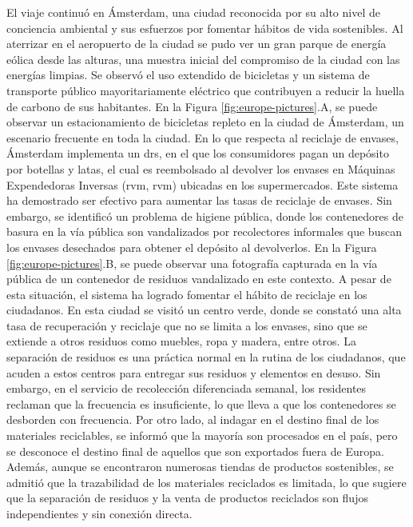 El viaje continuó en Ámsterdam, una ciudad reconocida por su alto nivel de conciencia ambiental y sus esfuerzos por fomentar hábitos de vida sostenibles. Al aterrizar en el aeropuerto de la ciudad se pudo ver un gran parque de energía eólica desde las alturas, una muestra inicial del compromiso de la ciudad con las energías limpias. Se observó el uso extendido de bicicletas y un sistema de transporte público mayoritariamente eléctrico que contribuyen a reducir la huella de carbono de sus habitantes. En la Figura \ref{fig:europe-pictures}.A, se puede observar un estacionamiento de bicicletas repleto en la ciudad de Ámsterdam, un escenario frecuente en toda la ciudad. En lo que respecta al reciclaje de envases, Ámsterdam implementa un \acrshort{drs}, en el que los consumidores pagan un depósito por botellas y latas, el cual es reembolsado al devolver los envases en Máquinas Expendedoras Inversas (\acrshort{rvm}, \acrlong{rvm}) ubicadas en los supermercados. Este sistema ha demostrado ser efectivo para aumentar las tasas de reciclaje de envases. Sin embargo, se identificó un problema de higiene pública, donde los contenedores de basura en la vía pública son vandalizados por recolectores informales que buscan los envases desechados para obtener el depósito al devolverlos. En la Figura \ref{fig:europe-pictures}.B, se puede observar una fotografía capturada en la vía pública de un contenedor de residuos vandalizado en este contexto. A pesar de esta situación, el sistema ha logrado fomentar el hábito de reciclaje en los ciudadanos. En esta ciudad se visitó un centro verde, donde se constató una alta tasa de recuperación y reciclaje que no se limita a los envases, sino que se extiende a otros residuos como muebles, ropa y madera, entre otros. La separación de residuos es una práctica normal en la rutina de los ciudadanos, que acuden a estos centros para entregar sus residuos y elementos en desuso. Sin embargo, en el servicio de recolección diferenciada semanal, los residentes reclaman que la frecuencia es insuficiente, lo que lleva a que los contenedores se desborden con frecuencia. Por otro lado, al indagar en el destino final de los materiales reciclables, se informó que la mayoría son procesados en el país, pero se desconoce el destino final de aquellos que son exportados fuera de Europa. Además, aunque se encontraron numerosas tiendas de productos sostenibles, se admitió que la \gls{trazabilidad} de los materiales reciclados es limitada, lo que sugiere que la separación de residuos y la venta de productos reciclados son flujos independientes y sin conexión directa.

